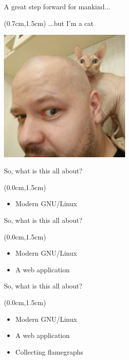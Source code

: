 \documentclass[xetex,14pt,aspectratio=169]{beamer}
\begin{document}
\begin{frame}{A great step forward for mankind...}
\begin{textblock*}{\framewidth-0.8cm}(0.7cm,1.5cm) %
...but I'm a cat
\begin{minipage}{\textwidth}
  \centering
  \includegraphics[height=6.6cm]{img/cat}
\end{minipage}
\end{textblock*}
\end{frame}

\begin{frame}{So, what is this all about?}
\begin{textblock*}{\framewidth-0.8cm}(0.0cm,1.5cm) %
\begin{itemize}
  \item Modern GNU/Linux
\end{itemize}
\end{textblock*}
\end{frame}

\begin{frame}{So, what is this all about?}
\begin{textblock*}{\framewidth-0.8cm}(0.0cm,1.5cm) %
\begin{itemize}
  \item Modern GNU/Linux
  \item A web application
\end{itemize}
\end{textblock*}
\end{frame}

\begin{frame}{So, what is this all about?}
\begin{textblock*}{\framewidth-0.8cm}(0.0cm,1.5cm) %
\begin{itemize}
  \item Modern GNU/Linux
  \item A web application
  \item Collecting flamegraphs
\end{itemize}
\end{textblock*}
\end{frame}
\end{document}
